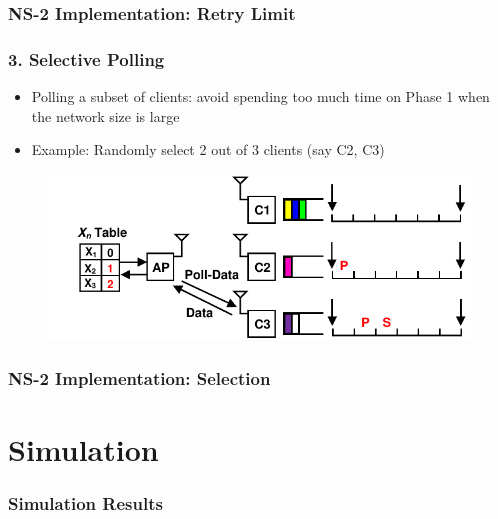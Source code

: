 \documentclass{beamer}
\begin{document}
\begin{frame}
\frametitle{NS-2 Implementation: Retry Limit}
\end{frame}

\begin{frame}
\frametitle{3. Selective Polling}
\begin{itemize}
\item Polling a subset of clients: avoid spending too much time on Phase 1 when the network size is large
\item Example: Randomly select 2 out of 3 clients (say C2, C3)
\end{itemize}
\begin{figure}
\centering
\includegraphics[scale=0.8]{selective_1.pdf}
\end{figure}
\end{frame}

\begin{frame}
\frametitle{NS-2 Implementation: Selection}
\end{frame}

\section{Simulation}
\begin{frame}
\frametitle{Simulation Results}
\end{frame}
\end{document}
